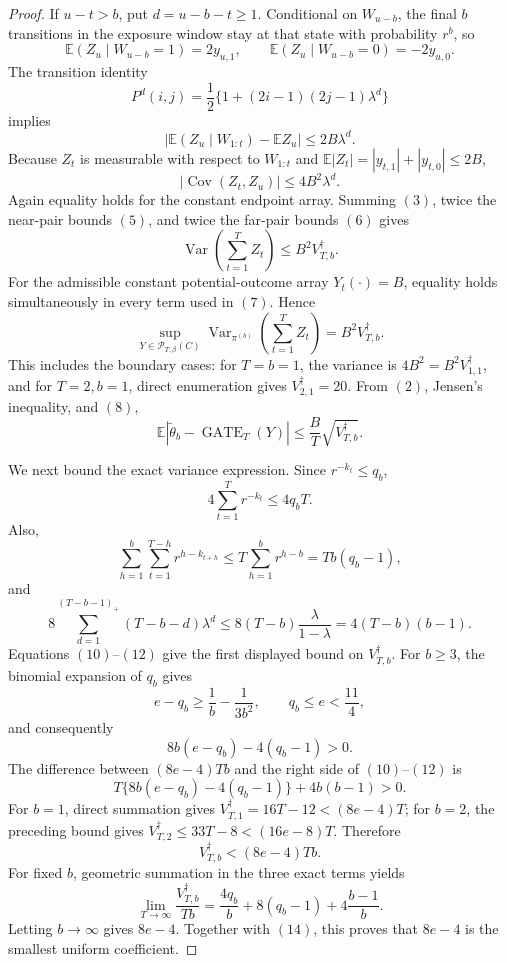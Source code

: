 \documentclass{article}
\begin{document}
\begin{proof}
If \(u-t>b\), put \(d=u-b-t\ge1\). Conditional on \(W_{u-b}\), the final \(b\) transitions in the exposure window stay at that state with probability \(r^b\), so
\[
\mathbb E(Z_u\mid W_{u-b}=1)=2y_{u,1},\qquad \mathbb E(Z_u\mid W_{u-b}=0)=-2y_{u,0}.
\]
The transition identity
\[
P^d(i,j)=\frac12\{1+(2i-1)(2j-1)\lambda^d\}
\]
implies
\[
\left|\mathbb E(Z_u\mid W_{1:t})-\mathbb EZ_u\right|\le2B\lambda^d.
\]
Because \(Z_t\) is measurable with respect to \(W_{1:t}\) and \(\mathbb E|Z_t|=|y_{t,1}|+|y_{t,0}|\le2B\),
\[
|\operatorname{Cov}(Z_t,Z_u)|\le4B^2\lambda^d.
\tag{6}
\]
Again equality holds for the constant endpoint array. Summing \((3)\), twice the near-pair bounds \((5)\), and twice the far-pair bounds \((6)\) gives
\[
\operatorname{Var}\!\left(\sum_{t=1}^TZ_t\right)\le B^2V_{T,b}^{\dagger}.
\tag{7}
\]
For the admissible constant potential-outcome array \(Y_t(\cdot)=B\), equality holds simultaneously in every term used in \((7)\). Hence
\[
\sup_{Y\in\mathcal P_{T,\beta}(C)}\operatorname{Var}_{\pi^{(b)}}\!\left(\sum_{t=1}^TZ_t\right)=B^2V_{T,b}^{\dagger}.
\tag{8}
\]
This includes the boundary cases: for \(T=b=1\), the variance is \(4B^2=B^2V_{1,1}^{\dagger}\), and for \(T=2,b=1\), direct enumeration gives \(V_{2,1}^{\dagger}=20\). From \((2)\), Jensen's inequality, and \((8)\),
\[
\mathbb E|\widetilde\theta_b-\operatorname{GATE}_T(Y)|\le\frac BT\sqrt{V_{T,b}^{\dagger}}.
\tag{9}
\]

We next bound the exact variance expression. Since \(r^{-k_t}\le q_b\),
\[
4\sum_{t=1}^Tr^{-k_t}\le4q_bT.
\tag{10}
\]
Also,
\[
\sum_{h=1}^b\sum_{t=1}^{T-h}r^{h-k_{t+h}}\le T\sum_{h=1}^br^{h-b}=Tb(q_b-1),
\tag{11}
\]
and
\[
8\sum_{d=1}^{(T-b-1)_+}(T-b-d)\lambda^d\le8(T-b)\frac{\lambda}{1-\lambda}=4(T-b)(b-1).
\tag{12}
\]
Equations \((10)\)--\((12)\) give the first displayed bound on \(V_{T,b}^{\dagger}\). For \(b\ge3\), the binomial expansion of \(q_b\) gives
\[
e-q_b\ge\frac1b-\frac1{3b^2},\qquad q_b\le e<\frac{11}{4},
\]
and consequently
\[
8b(e-q_b)-4(q_b-1)>0.
\tag{13}
\]
The difference between \((8e-4)Tb\) and the right side of \((10)\)--\((12)\) is
\[
T\{8b(e-q_b)-4(q_b-1)\}+4b(b-1)>0.
\]
For \(b=1\), direct summation gives \(V_{T,1}^{\dagger}=16T-12<(8e-4)T\); for \(b=2\), the preceding bound gives \(V_{T,2}^{\dagger}\le33T-8<(16e-8)T\). Therefore
\[
V_{T,b}^{\dagger}< (8e-4)Tb.
\tag{14}
\]
For fixed \(b\), geometric summation in the three exact terms yields
\[
\lim_{T\to\infty}\frac{V_{T,b}^{\dagger}}{Tb}=\frac{4q_b}{b}+8(q_b-1)+4\frac{b-1}{b}.
\]
Letting \(b\to\infty\) gives \(8e-4\). Together with \((14)\), this proves that \(8e-4\) is the smallest uniform coefficient.


\end{proof}
\end{document}
